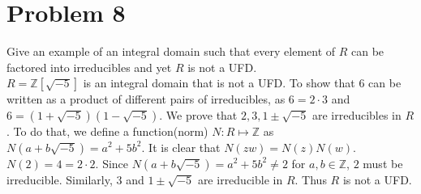 \documentclass[12pt]{article}
\begin{document}
\section*{Problem 8}

Give an example of an integral domain such that every element of $R$ can be factored into irreducibles and yet $R$ is not a UFD.
\\

\noindent $R = \mathbb{Z}[\sqrt{-5}]$ is an integral domain that is not a UFD. To show that $6$ can be written as a product of different pairs of irreducibles, as $6 = 2\cdot3$ and $6 = (1 + \sqrt{-5})(1 - \sqrt{-5})$. We prove that $2, 3, 1 \pm \sqrt{-5}$ are irreducibles in $R$. To do that, we define a function(norm) $N: R \mapsto \mathbb{Z}$ as $N(a + b\sqrt{-5}) = a^2 + 5b^2.$ It is clear that $N(zw) = N(z)N(w).$ $N(2) = 4= 2\cdot 2$. Since $N(a +  b\sqrt{-5}) = a^2 + 5b^2 \neq 2$ for $a, b \in \mathbb{Z}$, $2$ must be irreducible. Similarly, $3$ and $1 \pm \sqrt{-5}$ are irreducible in $R$. Thus $R$ is not a UFD. 
\end{document}
